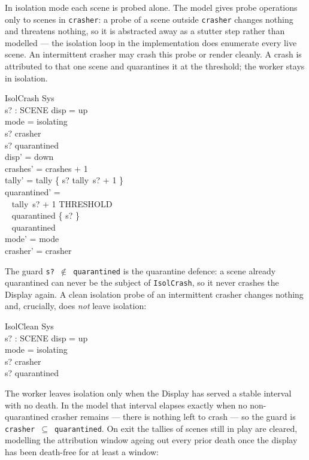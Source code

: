\documentclass[a4paper,10pt,fleqn]{article}
\begin{document}
In isolation mode each scene is probed alone.  The model gives probe
operations only to scenes in \texttt{crasher}: a probe of a scene outside
\texttt{crasher} changes nothing and threatens nothing, so it is abstracted
away as a stutter step rather than modelled --- the isolation loop in the
implementation does enumerate every live scene.  An intermittent crasher may crash
this probe or render cleanly.  A crash is attributed to that one scene and
quarantines it at the threshold; the worker stays in isolation.

\begin{schema}{IsolCrash}
  \Delta Sys \\
  s? : SCENE
\where
  disp = up \\
  mode = isolating \\
  s? \in crasher \\
  s? \notin quarantined \\
  disp' = down \\
  crashes' = crashes + 1 \\
  tally' = tally \oplus \{ s? \mapsto tally~s? + 1 \} \\
  quarantined' = \\
  \quad~ \IF tally~s? + 1 \geq THRESHOLD \\
  \quad~ \THEN quarantined \cup \{ s? \} \\
  \quad~ \ELSE quarantined \\
  mode' = mode \\
  crasher' = crasher
\end{schema}

The guard \texttt{s? $\notin$ quarantined} is the quarantine defence: a scene
already quarantined can never be the subject of \texttt{IsolCrash}, so it never
crashes the Display again.  A clean isolation probe of an intermittent crasher
changes nothing and, crucially, does \emph{not} leave isolation:

\begin{schema}{IsolClean}
  \Xi Sys \\
  s? : SCENE
\where
  disp = up \\
  mode = isolating \\
  s? \in crasher \\
  s? \notin quarantined
\end{schema}

The worker leaves isolation only when the Display has served a stable interval
with no death.  In the model that interval elapses exactly when no
non-quarantined crasher remains --- there is nothing left to crash --- so the
guard is \texttt{crasher $\subseteq$ quarantined}.  On exit the tallies of scenes
still in play are cleared, modelling the attribution window ageing out every
prior death once the display has been death-free for at least a window:
\end{document}
